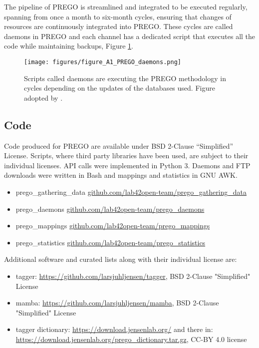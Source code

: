 The pipeline of PREGO is streamlined and integrated to be executed regularly,
spanning from once a month to six-month cycles, ensuring that changes of resources are
continuously integrated into PREGO. These cycles are called daemons in PREGO and 
each channel has a dedicated script that executes all the code while 
maintaining backups, Figure \ref{fig:devops}.


\begin{figure}[hbt!]
   \centering
   \texttt{[image: figures/figure\_A1\_PREGO\_daemons.png]}
   \caption[PREGO DevOps]{Scripts called daemons are executing the PREGO methodology in cycles depending on the updates of the databases used. Figure adopted by \parencite{microorganisms10020293}.}
   \label{fig:devops}
\end{figure}


   \subsection{Code} 
Code produced for PREGO are available under BSD 2-Clause “Simplified” License.
Scripts, where third party libraries have been used, are subject to their individual licenses.
API calls were implemented in Python 3. Daemons and FTP downloads were written in Bash and 
mappings and statistics in GNU AWK.
   
   \begin{itemize}
      \item prego\_gathering\_data 
      \href{https://github.com/lab42open-team/prego_gathering_data}{github.com/lab42open-team/prego\_gathering\_data}
      \item prego\_daemons \href{https://github.com/lab42open-team/prego_daemons}{github.com/lab42open-team/prego\_daemons}
      \item prego\_mappings \href{https://github.com/lab42open-team/prego_mappings}{github.com/lab42open-team/prego\_mappings} 
      \item prego\_statistics \href{https://github.com/lab42open-team/prego_statistics}{github.com/lab42open-team/prego\_statistics}
   \end{itemize}

Additional software and curated lists along with their individual license are:
   \begin{itemize}
      \item tagger:	\href{https://github.com/larsjuhljensen/tagger}{https://github.com/larsjuhljensen/tagger}, BSD 2-Clause "Simplified" License
      \item mamba: \href{https://github.com/larsjuhljensen/mamba}{https://github.com/larsjuhljensen/mamba}, BSD 2-Clause "Simplified" License 
      \item tagger dictionary:  \href{https://download.jensenlab.org/}{https://download.jensenlab.org/} and there in: \\
      \href{https://download.jensenlab.org/prego_dictionary.tar.gz}{https://download.jensenlab.org/prego\_dictionary.tar.gz}, CC-BY 4.0 license
   \end{itemize}

